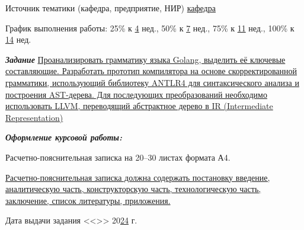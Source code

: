 Источник тематики (кафедра, предприятие, НИР) \uline{\hfill кафедра \hfill}

График выполнения работы:  25\% к \uline{4} нед., 50\% к \uline{7} нед., 75\% к \uline{11} нед., 100\% к \uline{14} нед.

\vfill

\textbf{\textit{Задание}}
\uline{
    Проанализировать грамматику языка Golang, выделить её ключевые составляющие.
    Разработать прототип компилятора на основе скорректированной грамматики, использующий
    библиотеку ANTLR4 для синтаксического анализа и построения AST-дерева. Для последующих преобразований необходимо использовать LLVM, переводящий
    абстрактное дерево в IR (Intermediate Representation)
    \hfill}

\vfill

\textbf{\textit{Оформление курсовой работы:}}

Расчетно-пояснительная записка на 20--30 листах формата А4.

\uline{Расчетно-пояснительная записка должна содержать постановку введение, аналитическую часть, конструкторскую часть, технологическую часть, заключение, список литературы, приложения.
    \hfill}

%

\vfill

Дата выдачи задания
 <<\uline{\mbox{\hspace*{5mm}}}>> \uline{\mbox{\hspace*{2.5cm}}} 20\uline{24} г.

\endgroup

\vfill

